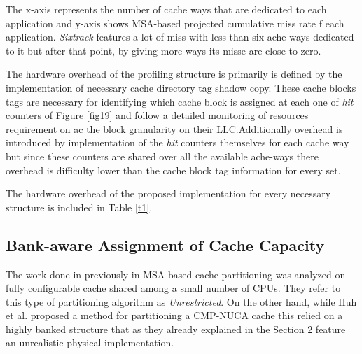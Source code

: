 \documentclass{report}
\begin{document}
The x-axis represents the number of cache ways that are dedicated to each application and y-axis shows MSA-based projected cumulative miss rate f each application. \emph{Sixtrack } features a lot of miss with less than six ache ways dedicated to it but after that point, by giving more ways its misse are close to zero. \vspace{.8cm}

The hardware overhead of the profiling structure is primarily is defined by the implementation of necessary cache directory tag shadow copy. These cache blocks tags are necessary for identifying which cache block is assigned at each one of \emph{hit} counters of Figure \ref{fig19} and follow a detailed monitoring of resources requirement on ac the block granularity on their LLC.Additionally overhead is introduced by implementation of the \emph{hit} counters themselves for each cache way but since these counters are shared over all the available ache-ways there overhead is difficulty lower than the cache block tag information for every set.

\begin{table}[h!]
\centering
\caption{ Overhead of the proposed MSA Profiler}
\label{t1}
\end{table}


The hardware overhead of the proposed implementation for every necessary structure is included in Table \ref{t1}. 

 \subsection{ Bank-aware Assignment of Cache Capacity }

The work done in previously in MSA-based cache partitioning was analyzed on fully configurable cache shared among a small number of CPUs. They refer to this type of partitioning algorithm as \emph{Unrestricted}. On the other hand, while Huh et al. proposed a method for partitioning a CMP-NUCA cache this relied on a highly banked structure that as they already explained in the Section 2 feature an unrealistic physical implementation. 
\end{document}
